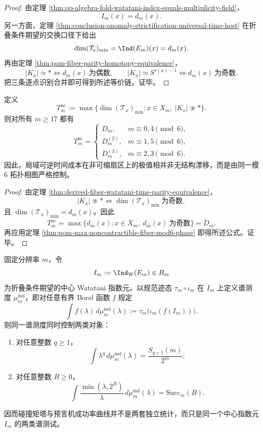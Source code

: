 \begin{proof}
由定理 \ref{thm:op-algebra-fold-watatani-index-equals-multiplicity-field}，
\[
I_m(x)=d_m(x).
\]
另一方面，定理 \ref{thm:conclusion-anomaly-strictification-universal-time-host} 在折叠条件期望的交换口径下给出
\[
\dim(\mathcal T_x)_{\min}=\Ind(E_m)(x)=d_m(x).
\]
再由定理 \ref{thm:pom-fiber-parity-homotopy-equivalence}，
\[
|K_x|\simeq \ast \iff d_m(x)\ \text{为偶数},
\qquad
|K_x|\simeq S^{\tau(x)-1}\iff d_m(x)\ \text{为奇数}.
\]
把三条逐点识别合并即可得到所述等价链。证毕。
\end{proof}

\begin{corollary}[非可缩局域时间纤维的模 \(6\) 相图]\label{cor:derived-noncontractible-local-time-mod6}
定义
\[
T_m^{\mathrm{nc}}
:=
\max\bigl\{\dim(\mathcal T_x)_{\min}:x\in X_m,\ |K_x|\not\simeq \ast\bigr\}.
\]
则对所有 \(m\ge 17\) 都有
\[
T_m^{\mathrm{nc}}=
\begin{cases}
D_m, & m\equiv 0,4\pmod 6,\\[2pt]
D_m^{(2)}, & m\equiv 1,5\pmod 6,\\[2pt]
D_m^{(3)}, & m\equiv 2,3\pmod 6.
\end{cases}
\]
因此，局域可逆时间成本在非可缩扇区上的极值相并非无结构漂移，而是由同一模 \(6\) 拓扑相图严格控制。
\end{corollary}

\begin{proof}
由定理 \ref{thm:derived-fiber-watatani-time-parity-equivalence}，
\[
|K_x|\not\simeq \ast
\iff
\dim(\mathcal T_x)_{\min}\ \text{为奇数},
\]
且 \(\dim(\mathcal T_x)_{\min}=d_m(x)\)。因此
\[
T_m^{\mathrm{nc}}
=
\max\{d_m(x):x\in X_m,\ d_m(x)\ \text{为奇数}\}
=
\widetilde D_m.
\]
再应用定理 \ref{thm:pom-max-noncontractible-fiber-mod6-phase} 即得所述公式。证毕。
\end{proof}

\begin{theorem}\label{thm:derived-index-spectral-measure-collision-success}
固定分辨率 \(m\)，令
\[
I_m:=\Ind_{\mathrm W}(E_m)\in B_m
\]
为折叠条件期望的中心 Watatani 指数元。以规范迹态 \(\tau_m\circ \iota_m\) 在 \(I_m\) 上定义谱测度 \(\mu_m^{\mathrm{ind}}\)，即对任意有界 Borel 函数 \(f\) 规定
\[
\int f(\lambda)\,d\mu_m^{\mathrm{ind}}(\lambda)
:=
\tau_m\!\bigl(\iota_m(f(I_m))\bigr).
\]
则同一谱测度同时控制两类对象：
\begin{enumerate}
\normalfont
  \item 对任意整数 \(q\ge 1\)，
  \[
  \int \lambda^q\,d\mu_m^{\mathrm{ind}}(\lambda)
  =
  \frac{S_{q+1}(m)}{2^m};
  \]
  \item 对任意整数 \(B\ge 0\)，
  \[
  \int \frac{\min(\lambda,2^B)}{\lambda}\,d\mu_m^{\mathrm{ind}}(\lambda)
  =
  \mathrm{Succ}_m(B).
  \]
\end{enumerate}
因而碰撞矩塔与预言机成功率曲线并不是两套独立统计，而只是同一个中心指数元 \(I_m\) 的两类谱测试。
\end{theorem}


